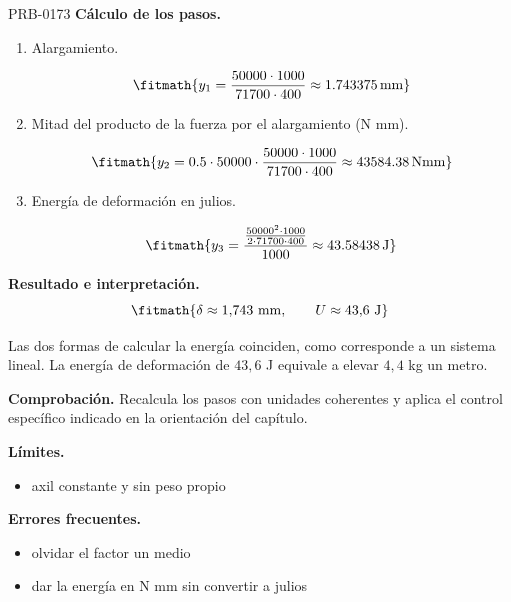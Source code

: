 \begin{studiumworked}{PRB-0173}
\textbf{Cálculo de los pasos.}

\begin{enumerate}

\item Alargamiento.

\[\fitmath{y_{1}=\frac{50000\cdot 1000}{71700\cdot 400}\approx 1.743375\,\mathrm{mm}}\]

\item Mitad del producto de la fuerza por el alargamiento (N mm).

\[\fitmath{y_{2}=0.5\cdot 50000\cdot \frac{50000\cdot 1000}{71700\cdot 400}\approx 43584.38\,\mathrm{N mm}}\]

\item Energía de deformación en julios.

\[\fitmath{y_{3}=\frac{\frac{{50000}^{2}\cdot 1000}{2\cdot 71700\cdot 400}}{1000}\approx 43.58438\,\mathrm{J}}\]

\end{enumerate}

\textbf{Resultado e interpretación.}\[\fitmath{\delta \approx 1{,}743\ \mathrm{mm},\qquad U \approx 43{,}6\ \mathrm{J}}\]

Las dos formas de calcular la energía coinciden, como corresponde a un sistema lineal. La energía de deformación de $43{,}6$ J equivale a elevar $4{,}4$ kg un metro.

\par\textbf{Comprobación.} Recalcula los pasos con unidades coherentes y aplica el control específico indicado en la orientación del capítulo.

\textbf{Límites.}\begin{itemize}\item axil constante y sin peso propio\end{itemize}

\textbf{Errores frecuentes.}\begin{itemize}\item olvidar el factor un medio
\item dar la energía en N mm sin convertir a julios\end{itemize}

\end{studiumworked}

\Needspace{.3\textheight}

